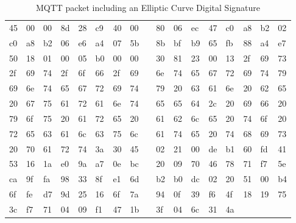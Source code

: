 \begin{table}[]
\centering
\begin{tabular}{lllllllllllllllll}
45 & 00 & 00 & 8d & 28 & c9 & 40 & 00 &  & 80 & 06 & ec & 47 & c0 & a8 & b2 & 02 \\
c0 & a8 & b2 & 06 & e6 & a4 & 07 & 5b &  & 8b & bf & b9 & 65 & fb & 88 & a4 & e7 \\
50 & 18 & 01 & 00 & 05 & b0 & 00 & 00 &  & 30 & 81 & 23 & 00 & 13 & 2f & 69 & 73 \\
2f & 69 & 74 & 2f & 6f & 66 & 2f & 69 &  & 6e & 74 & 65 & 67 & 72 & 69 & 74 & 79 \\
69 & 6e & 74 & 65 & 67 & 72 & 69 & 74 &  & 79 & 20 & 63 & 61 & 6e & 20 & 62 & 65 \\
20 & 67 & 75 & 61 & 72 & 61 & 6e & 74 &  & 65 & 65 & 64 & 2c & 20 & 69 & 66 & 20 \\
79 & 6f & 75 & 20 & 61 & 72 & 65 & 20 &  & 61 & 62 & 6c & 65 & 20 & 74 & 6f & 20 \\
72 & 65 & 63 & 61 & 6c & 63 & 75 & 6c &  & 61 & 74 & 65 & 20 & 74 & 68 & 69 & 73 \\
20 & 70 & 61 & 72 & 74 & 3a & 30 & 45 &  & 02 & 21 & 00 & de & b1 & 60 & fd & 41 \\
53 & 16 & 1a & e0 & 9a & a7 & 0e & bc &  & 20 & 09 & 70 & 46 & 78 & 71 & f7 & 5e \\
ca & 9f & fa & 98 & 33 & 8f & e1 & 6d &  & b2 & b0 & dc & 02 & 20 & 51 & 00 & b4 \\
6f & fe & d7 & 9d & 25 & 16 & 6f & 7a &  & 94 & 0f & 39 & f6 & 4f & 18 & 19 & 75 \\
3c & f7 & 71 & 04 & 09 & f1 & 47 & 1b &  & 3f & 04 & 6c & 31 & 4a &    &    &    \\   
\end{tabular}
\caption{MQTT packet including an Elliptic Curve Digital Signature}
\label{tab:ecc-table}
\end{table}
